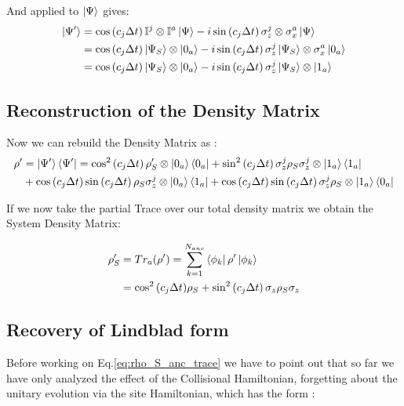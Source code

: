 \documentclass[a4paper,12pt]{article}
\begin{document}
	And applied to $ \ket{\Psi} $ gives:
	\begin{align}
		\ket{\Psi'} &= \cos \left(c_j \Delta t \right) \mathbb{I}^j \otimes \mathbb{I}^a \ket{\Psi} - i \sin \left(c_j \Delta t \right) \sigma_{z}^{j} \otimes \sigma_{x}^{a} \ket{\Psi} \notag \\
		&= \cos \left(c_j \Delta t \right) \ket{\Psi_S} \otimes \ket{0_a} - i \sin \left(c_j \Delta t \right) \sigma_{z}^{j} \ket{\Psi_S} \otimes \sigma_{x}^{a} \ket{0_a} \notag \\
		&= \cos \left(c_j \Delta t \right) \ket{\Psi_S} \otimes \ket{0_a} - i \sin \left(c_j \Delta t \right) \sigma_{z}^{j} \ket{\Psi_S} \otimes \ket{1_a}
		\label{eq:psi_evo_QJ}
	\end{align}

	\subsection{Reconstruction of the Density Matrix}
	\label{sub:Reconstruction_of_the_Density_Matrix_QJ}
	Now we can rebuild the Density Matrix as :
	\begin{align}
		\rho' &= \ket{\Psi'}\bra{\Psi'} = \cos^{2} \left(c_j \Delta t \right) \rho_S' \otimes \ket{0_a}\bra{0_a} + \sin^{2} \left(c_j \Delta t \right) \sigma_{z}^{j} \rho_S \sigma_{z}^{j} \otimes \ket{1_a}\bra{1_a} \notag \\
		&+ \cos \left(c_j \Delta t \right) \sin \left(c_j \Delta t \right) \rho_S \sigma_{z}^{j} \otimes \ket{0_a} \bra{1_a} + \cos \left(c_j \Delta t \right) \sin \left(c_j \Delta t \right) \sigma_{z}^{j} \rho_S \otimes \ket{1_a} \bra{0_a}
		\label{eq:rho_reconstruction}
	\end{align}

	\begin{flushleft}
		If we now take the partial Trace over our total density matrix we obtain the System Density Matrix:
	\end{flushleft}

	\begin{align}
		\rho'_S & = Tr_a(\rho') = \sum_{k=1}^{N_{anc}}{\bra{\phi_k}\rho'\ket{\phi_k}} \notag \\
		&= \cos^{2}{\left(c_{j} \Delta t\right)} \rho_S + \sin^{2}{\left(c_{j} \Delta t\right)} \, \sigma_{z} \rho_S \sigma_{z}
		\label{eq:rho_S_anc_trace}
	\end{align}

	\subsection{Recovery of Lindblad form}
	\label{sub:Recovery_of_Lindblad_form_QJ}
	Before working on Eq.\eqref{eq:rho_S_anc_trace} we have to point out that so far we have only analyzed the effect of the Collisional Hamiltonian, forgetting about the unitary evolution via the site Hamiltonian, which has the form :
\end{document}
